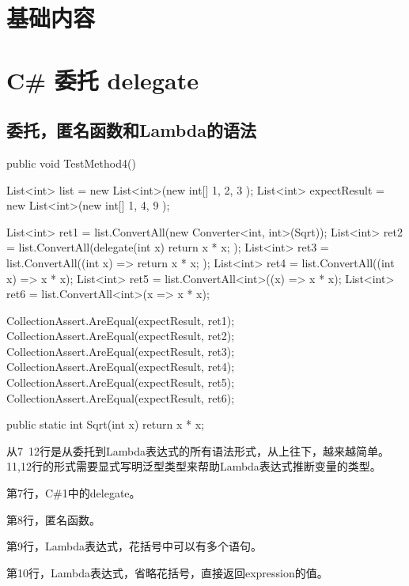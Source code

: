 \chapter{基础内容}

\chapter{C\# 委托 delegate}



\section{委托，匿名函数和Lambda的语法}


\begin{CSharp}[委托，匿名函数和Lambda]
        [TestMethod]
        public void TestMethod4()
        {
            List<int> list = new List<int>(new int[] { 1, 2, 3 });
            List<int> expectResult = new List<int>(new int[] { 1, 4, 9 });

            List<int> ret1 = list.ConvertAll(new Converter<int, int>(Sqrt));
            List<int> ret2 = list.ConvertAll(delegate(int x) { return x * x; });
            List<int> ret3 = list.ConvertAll((int x) => { return x * x; });
            List<int> ret4 = list.ConvertAll((int x) => x * x);
            List<int> ret5 = list.ConvertAll<int>((x) => x * x);
            List<int> ret6 = list.ConvertAll<int>(x => x * x);

            CollectionAssert.AreEqual(expectResult, ret1);
            CollectionAssert.AreEqual(expectResult, ret2);
            CollectionAssert.AreEqual(expectResult, ret3);
            CollectionAssert.AreEqual(expectResult, ret4);
            CollectionAssert.AreEqual(expectResult, ret5);
            CollectionAssert.AreEqual(expectResult, ret6);
        }

        public static int Sqrt(int x)
        {
            return x * x;
        }
\end{CSharp}

从7~12行是从委托到Lambda表达式的所有语法形式，从上往下，越来越简单。11,12行的形式需要显式写明泛型类型来帮助Lambda表达式推断变量的类型。


第7行，C\#1中的delegate。

第8行，匿名函数。

第9行，Lambda表达式，花括号中可以有多个语句。

第10行，Lambda表达式，省略花括号，直接返回expression的值。

